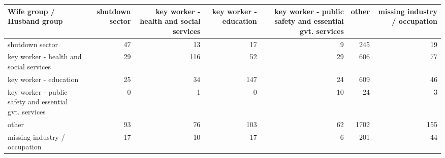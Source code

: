 
\begin{tabular}{lrrrrrr}
\toprule
Wife group / Husband group & shutdown sector & key worker - health
 and social services & key worker - education & key worker - public safety
 and essential gvt. services & other & missing industry / occupation\\
\midrule
shutdown sector & 47 & 13 & 17 & 9 & 245 & 19\\
key worker - health
 and social services & 29 & 116 & 52 & 29 & 606 & 77\\
key worker - education & 25 & 34 & 147 & 24 & 609 & 46\\
key worker - public safety
 and essential gvt. services & 0 & 1 & 0 & 10 & 24 & 3\\
other & 93 & 76 & 103 & 62 & 1702 & 155\\
missing industry / occupation & 17 & 10 & 17 & 6 & 201 & 44\\
\bottomrule
\end{tabular}
